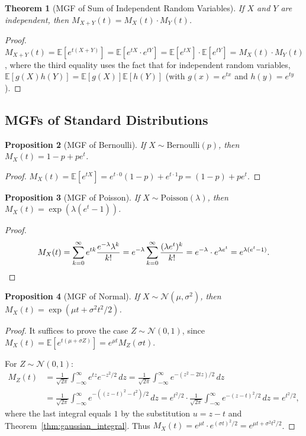 \documentclass[11pt,a4paper]{article}
\theoremstyle{definition}
\theoremstyle{plain}
\newtheorem{theorem}{Theorem}[section]
\newtheorem{proposition}[theorem]{Proposition}
\theoremstyle{remark}
\newcommand{\E}{\mathbb{E}}
\begin{document}
\begin{theorem}[MGF of Sum of Independent Random Variables]
\label{thm:mgf_sum}
If $X$ and $Y$ are independent, then $M_{X+Y}(t) = M_X(t) \cdot M_Y(t)$.
\end{theorem}

\begin{proof}
$M_{X+Y}(t) = \E[e^{t(X+Y)}] = \E[e^{tX} \cdot e^{tY}] = \E[e^{tX}]\cdot\E[e^{tY}]
= M_X(t) \cdot M_Y(t)$,
where the third equality uses the fact that for independent random variables,
$\E[g(X)h(Y)] = \E[g(X)]\E[h(Y)]$ (with $g(x) = e^{tx}$ and $h(y) = e^{ty}$).
\end{proof}

\subsection{MGFs of Standard Distributions}

\begin{proposition}[MGF of Bernoulli]
\label{prop:mgf_bernoulli}
If $X \sim \mathrm{Bernoulli}(p)$, then $M_X(t) = 1 - p + pe^t$.
\end{proposition}

\begin{proof}
$M_X(t) = \E[e^{tX}] = e^{t \cdot 0}(1-p) + e^{t \cdot 1} p = (1-p) + pe^t$.
\end{proof}

\begin{proposition}[MGF of Poisson]
\label{prop:mgf_poisson}
If $X \sim \mathrm{Poisson}(\lambda)$, then $M_X(t) = \exp(\lambda(e^t - 1))$.
\end{proposition}

\begin{proof}
\[
    M_X(t) = \sum_{k=0}^\infty e^{tk}\frac{e^{-\lambda}\lambda^k}{k!}
    = e^{-\lambda}\sum_{k=0}^\infty \frac{(\lambda e^t)^k}{k!}
    = e^{-\lambda}\cdot e^{\lambda e^t} = e^{\lambda(e^t - 1)}.
    \qedhere
\]
\end{proof}

\begin{proposition}[MGF of Normal]
\label{prop:mgf_normal}
If $X \sim \mathcal{N}(\mu, \sigma^2)$, then $M_X(t) = \exp(\mu t + \sigma^2 t^2/2)$.
\end{proposition}

\begin{proof}
It suffices to prove the case $Z \sim \mathcal{N}(0,1)$, since
$M_X(t) = \E[e^{t(\mu + \sigma Z)}] = e^{\mu t} M_Z(\sigma t)$.

For $Z \sim \mathcal{N}(0,1)$:
\begin{align*}
    M_Z(t) &= \frac{1}{\sqrt{2\pi}}\int_{-\infty}^\infty e^{tz} e^{-z^2/2}\,dz
    = \frac{1}{\sqrt{2\pi}}\int_{-\infty}^\infty e^{-(z^2 - 2tz)/2}\,dz \\
    &= \frac{1}{\sqrt{2\pi}}\int_{-\infty}^\infty e^{-((z-t)^2 - t^2)/2}\,dz
    = e^{t^2/2} \cdot \frac{1}{\sqrt{2\pi}}\int_{-\infty}^\infty e^{-(z-t)^2/2}\,dz
    = e^{t^2/2},
\end{align*}
where the last integral equals $1$ by the substitution $u = z - t$ and
Theorem~\ref{thm:gaussian_integral}. Thus $M_X(t) = e^{\mu t} \cdot e^{(\sigma t)^2/2}
= e^{\mu t + \sigma^2 t^2/2}$.
\end{proof}
\end{document}
